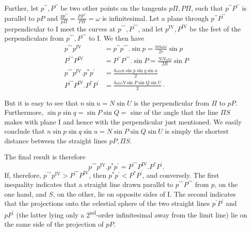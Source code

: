 Further, let \(p^{\prime\prime},P^{\prime\prime}\) be two other points on the tangents \(p\Pi,P\Pi\), such that \(p^{\prime\prime}P^{\prime\prime}\) is parallel to \(pP\) and \(\frac{pp^{\prime\prime}}{p\Pi}=\frac{PP^{\prime\prime}}{P\Pi}=\omega\) is infinitesimal. Let a plane through \(p^{\prime\prime}P^{\prime\prime}\) perpendicular to I meet the curves at \(p^{\prime\prime\prime},P^{\prime\prime\prime}\), and let \(p^{\mathrm{IV}},P^{\mathrm{IV}}\) be the feet of the perpendiculars from \(p^{\prime\prime\prime},P^{\prime\prime\prime}\) to I. We then have
\[
\begin{aligned}
p^{\prime\prime\prime}p^{\mathrm{IV}}&=p^{\prime\prime}p^{\prime\prime\prime}\mathord{.}\sin p=\frac{nn\omega\omega}{2r}\sin p\\[5pt]
P^{\prime\prime\prime}P^{\mathrm{IV}}&=P^{\prime\prime}P^{\prime\prime\prime}\mathord{.}\sin P=\frac{NN\omega\omega}{2R}\sin P\\[5pt]
p^{\prime\prime\prime}p^{\mathrm{IV}}\mathord{.}p^{*}p^{\prime}&=\frac{\delta\omega\omega n\sin p\sin q\sin u}{2}\\[5pt]
P^{\prime\prime\prime}P^{\mathrm{IV}}\mathord{.}P^{*}P^{\prime}&=\frac{\delta\omega\omega N\sin P\sin Q\sin U}{2}\mathpunct{\cdot}
\end{aligned}
\]

But it is easy to see that \(n\sin u=N\sin U\) is the perpendicular from \(\Pi\) to \(pP\). Furthermore, \(\sin p\sin q=\sin P\sin Q={}\) sine of the angle that the line \(\Pi S\) makes with plane I and hence with the perpendicular just mentioned. We easily conclude that \(n\sin p\sin q\sin u=N\sin P\sin Q\sin U\) is simply the shortest distance between the straight lines \(pP,\Pi S\).

The final result is therefore
\[
p^{\prime\prime\prime}p^{\mathrm{IV}}\mathord{.}p^{*}p^{\prime}=P^{\prime\prime\prime}P^{\mathrm{IV}}\mathord{.}P^{*}P^{\prime}.
\]
If, therefore, \(p^{\prime\prime\prime}p^{\mathrm{IV}}>P^{\prime\prime\prime}P^{\mathrm{IV}}\), then \(p^{*}p^{\prime}<P^{*}P^{\prime}\), and conversely. The first inequality indicates that a straight line drawn parallel to \(p^{\prime\prime\prime}P^{\prime\prime\prime}\) from \(p\), on the one hand, and \(S\), on the other, lie on opposite sides of I. The second indicates that the projections onto the celestial sphere of the two straight lines \(p^{\prime}P^{\prime}\) and \(pP^{\prime}\) (the latter lying only a 2\textsuperscript{nd}-order infinitesimal away from the limit line) lie on the same side of the projection of \(pP\).


